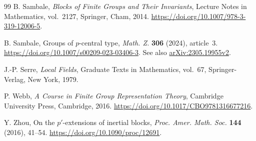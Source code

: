 \documentclass[11pt,a4paper]{article}
\theoremstyle{definition}
\theoremstyle{remark}
\numberwithin{equation}{section}
\begin{document}
\begin{thebibliography}{99}
		 B. Sambale, \textit{Blocks of Finite Groups and Their Invariants}, Lecture Notes in Mathematics, vol.~2127, Springer, Cham, 2014. \url{https://doi.org/10.1007/978-3-319-12006-5}.
		
		 B. Sambale, Groups of $p$-central type, \textit{Math. Z.} \textbf{306} (2024), article~3. \url{https://doi.org/10.1007/s00209-023-03406-3}. See also \href{https://arxiv.org/abs/2305.19955v2}{arXiv:2305.19955v2}.
		
		 J.-P. Serre, \textit{Local Fields}, Graduate Texts in Mathematics, vol.~67, Springer-Verlag, New York, 1979.
		
		 P. Webb, \textit{A Course in Finite Group Representation Theory}, Cambridge University Press, Cambridge, 2016. \url{https://doi.org/10.1017/CBO9781316677216}.
		
		 Y. Zhou, On the $p'$-extensions of inertial blocks, \textit{Proc. Amer. Math. Soc.} \textbf{144} (2016), 41--54. \url{https://doi.org/10.1090/proc/12691}.
	\end{thebibliography}
\end{document}

